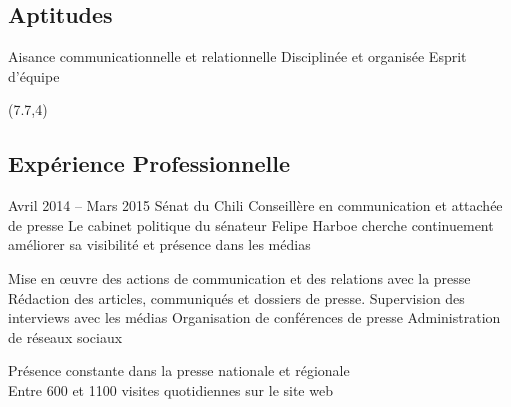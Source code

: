 \documentclass[30pt, french]{tccv}
\begin{document}
\begin{upshape}
\begin{textblock}{7}
\begin{mdframed}
\section{Aptitudes}
\begin{itemize}[leftmargin=13pt]
  \setlength\itemsep{-3pt} 
  \cvitem[\checkmark]  Aisance communicationnelle et relationnelle 
  \cvitem[\checkmark]  Disciplinée et organisée 
  \cvitem[\checkmark]  Esprit d'équipe 
\end{itemize}



\end{mdframed}
\end{textblock}



\begin{textblock}{13}(7.7,4)
\begin{mdframed}
\section{Expérience Professionnelle}


\begin{eventlist}

\setlength{\parskip}{0pt}
\item{Avril 2014 -- Mars 2015}
     {Sénat du Chili}
     {Conseillère en communication et attachée de presse}
     \fontsize{9pt}{1em}\color{text}\bodyfontlight\upshape\selectfont
      Le cabinet politique du sénateur Felipe Harboe cherche continuement améliorer sa visibilité et présence dans les médias \\ 

    \setlength{\parskip}{-10pt}
    \begin{itemize}
      \setlength\itemsep{-3pt} 
      \cvitem[\checkmark] Mise en œuvre des actions de communication et des relations avec la presse
      \cvitem[\checkmark] Rédaction des articles, communiqués et dossiers de presse. Supervision des interviews avec les médias
      \cvitem[\checkmark] Organisation de conférences de presse
      \cvitem[\checkmark] Administration de réseaux sociaux
    \end{itemize}     
     Présence constante dans la presse nationale et régionale  \\
    \makebox[1.4cm][l]{}          Entre 600 et 1100 visites quotidiennes sur le site web 
               

\end{eventlist}
\end{mdframed}
\end{textblock}
\end{upshape}
\end{document}

